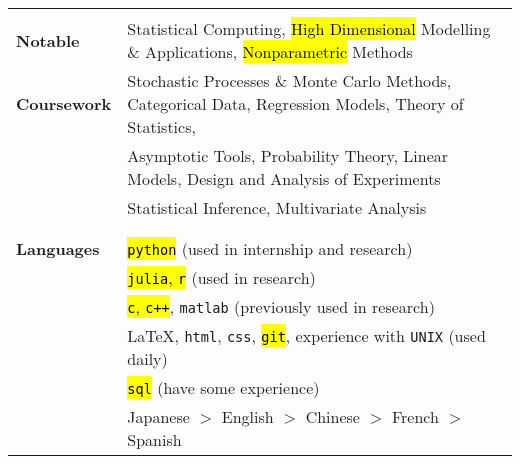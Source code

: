\documentclass[utf8,letterpaper,oneside]{article}
\begin{document}
\begin{center}
\begin{tabular}{l l}
                           &                                                                                                               \\
  \textbf{Notable}         & Statistical Computing, \hl{High Dimensional} Modelling \& Applications, \hl{Nonparametric} Methods            \\
  \textbf{Coursework}      & Stochastic Processes \& Monte Carlo Methods, Categorical Data, Regression Models, Theory of Statistics,       \\
                           & Asymptotic Tools, Probability Theory, Linear Models, Design and Analysis of Experiments                       \\
                           & Statistical Inference, Multivariate Analysis                                                                  \\                                                       
                           &                                                                                                               \\ \hline
                           &                                                                                                               \\
  \textbf{Languages}       & \hl{\texttt{python}} (used in internship and research)                                                        \\
                           & \hl{\texttt{julia}, \texttt{r}} (used in research)                                                            \\
                           & \hl{\texttt{c}, \texttt{c++}}, \texttt{matlab} (previously used in research)                                  \\
                           & \LaTeX, \texttt{html}, \texttt{css}, \hl{\texttt{git}}, experience with \texttt{UNIX} (used daily)            \\
                           & \hl{\texttt{sql}} (have some experience)                                                                      \\
                           & Japanese $>$ English $>$ Chinese $>$ French $>$ Spanish                                                       \\
 \end{tabular}
\end{center}
\end{document}
